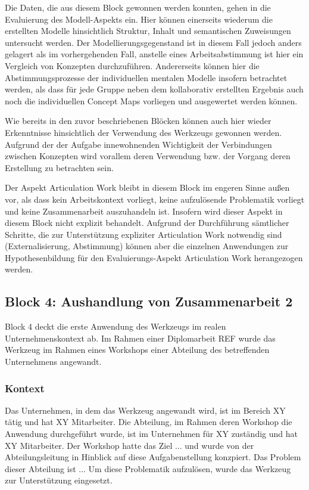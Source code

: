 Die Daten, die aus diesem Block gewonnen werden konnten, gehen in die Evaluierung des Modell-Aspekts ein. Hier können einerseits wiederum die erstellten Modelle hinsichtlich Struktur, Inhalt und semantischen Zuweisungen untersucht werden. Der Modellierungsgegenstand ist in diesem Fall jedoch anders gelagert als im vorhergehenden Fall, anstelle eines Arbeitsabstimmung ist hier ein Vergleich von Konzepten durchzuführen. Andererseits können hier die Abstimmungsprozesse der individuellen mentalen Modelle insofern betrachtet werden, als dass für jede Gruppe neben dem kollaborativ erstellten Ergebnis auch noch die individuellen Concept Maps vorliegen und ausgewertet werden können.

Wie bereits in den zuvor beschriebenen Blöcken können auch hier wieder Erkenntnisse hinsichtlich der Verwendung des Werkzeugs gewonnen werden. Aufgrund der der Aufgabe innewohnenden Wichtigkeit der Verbindungen zwischen Konzepten wird vorallem deren Verwendung bzw. der Vorgang deren Erstellung zu betrachten sein.

Der Aspekt Articulation Work bleibt in diesem Block im engeren Sinne außen vor, als dass kein Arbeitskontext vorliegt, keine aufzulösende Problematik vorliegt und keine Zusammenarbeit auszuhandeln ist. Insofern wird dieser Aspekt in diesem Block nicht explizit behandelt. Aufgrund der Durchführung sämtlicher Schritte, die zur Unterstützung expliziter Articulation Work notwendig sind (Externalisierung, Abstimmung) können aber die einzelnen Anwendungen zur Hypothesenbildung für den Evaluierungs-Aspekt Articulation Work herangezogen werden.


\subsection{Block 4: Aushandlung von Zusammenarbeit 2}
\label{sub:eval_4}

Block 4 deckt die erste Anwendung des Werkzeugs im realen Unternehmenskontext ab. Im Rahmen einer Diplomarbeit REF wurde das Werkzeug im Rahmen eines Workshops einer Abteilung des betreffenden Unternehmens angewandt.

\subsubsection{Kontext} %
\label{ssub:4_kontext}

Das Unternehmen, in dem das Werkzeug angewandt wird, ist im Bereich XY tätig und hat XY Mitarbeiter. Die Abteilung, im Rahmen deren Workshop die Anwendung durchgeführt wurde, ist im Unternehmen für XY zuständig und hat XY Mitarbeiter. Der Workshop hatte das Ziel ... und wurde von der Abteilungsleitung in Hinblick auf diese Aufgabenstellung konzpiert. Das Problem dieser Abteilung ist ... Um diese Problematik aufzulösen, wurde das Werkzeug zur Unterstützung eingesetzt.

